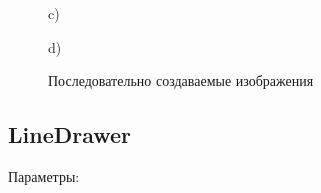 \documentclass[14pt,a4paper,report]{report}
\begin{document}
\begin{figure}[h!]
\begin{minipage}[h]{0.47\linewidth}
 c) \\
\end{minipage}
\hfill
\begin{minipage}[h]{0.47\linewidth}
 d) \\
\end{minipage}
\caption{Последовательно создаваемые изображения}
\label{ris:experimentalcorrelationsignals}
\end{figure}


\clearpage
\subsection{LineDrawer}
Параметры:
\end{document}

